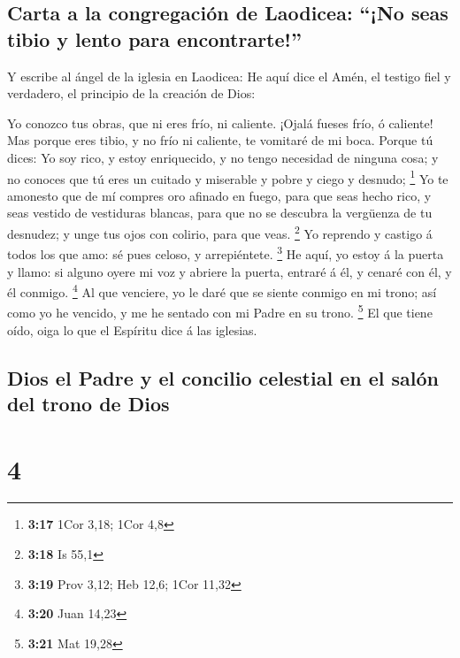\hypertarget{carta-a-la-congregaciuxf3n-de-laodicea-no-seas-tibio-y-lento-para-encontrarte}{%
\subsection{Carta a la congregación de Laodicea: ``¡No seas tibio y
lento para
encontrarte!''}\label{carta-a-la-congregaciuxf3n-de-laodicea-no-seas-tibio-y-lento-para-encontrarte}}

 Y escribe al ángel de la iglesia en Laodicea: He aquí
dice el Amén, el testigo fiel y verdadero, el principio de la creación
de Dios:

 Yo conozco tus obras, que ni eres frío, ni caliente.
¡Ojalá fueses frío, ó caliente!  Mas porque eres tibio, y
no frío ni caliente, te vomitaré de mi boca.  Porque tú
dices: Yo soy rico, y estoy enriquecido, y no tengo necesidad de ninguna
cosa; y no conoces que tú eres un cuitado y miserable y pobre y ciego y
desnudo; \footnote{\textbf{3:17} 1Cor 3,18; 1Cor 4,8}  Yo
te amonesto que de mí compres oro afinado en fuego, para que seas hecho
rico, y seas vestido de vestiduras blancas, para que no se descubra la
vergüenza de tu desnudez; y unge tus ojos con colirio, para que veas.
\footnote{\textbf{3:18} Is 55,1}  Yo reprendo y castigo á
todos los que amo: sé pues celoso, y arrepiéntete. \footnote{\textbf{3:19}
  Prov 3,12; Heb 12,6; 1Cor 11,32}  He aquí, yo estoy á
la puerta y llamo: si alguno oyere mi voz y abriere la puerta, entraré á
él, y cenaré con él, y él conmigo. \footnote{\textbf{3:20} Juan 14,23}
 Al que venciere, yo le daré que se siente conmigo en mi
trono; así como yo he vencido, y me he sentado con mi Padre en su trono.
\footnote{\textbf{3:21} Mat 19,28}  El que tiene oído,
oiga lo que el Espíritu dice á las iglesias.

\hypertarget{dios-el-padre-y-el-concilio-celestial-en-el-saluxf3n-del-trono-de-dios}{%
\subsection{Dios el Padre y el concilio celestial en el salón del trono
de
Dios}\label{dios-el-padre-y-el-concilio-celestial-en-el-saluxf3n-del-trono-de-dios}}

\hypertarget{section-3}{%
\section{4}\label{section-3}}

